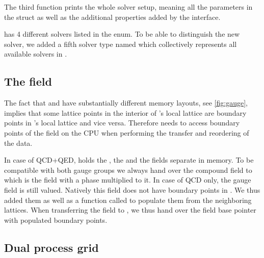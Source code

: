 The third function prints the whole solver setup, meaning all the parameters in the  struct as well as the additional properties added by the interface.

\Openqxd has \num{4} different solvers listed in the  enum. To be able to distinguish the new solver, we added a fifth solver type named  which collectively represents all available solvers in \quda.

\subsection{The  field}

The fact that \openqxd and \quda have substantially different memory layouts, see \cref{fig:gauge}, implies that some lattice points in the interior of \quda's local lattice are boundary points in \openqxd's local lattice and vice versa.
Therefore \quda needs to access boundary points of the field on the CPU when performing the transfer and reordering of the data.

In case of QCD+QED, \openqxd holds the , the  and the  fields separate in memory.
To be compatible with both gauge groups we always hand over the compound  field to \quda which is the  field with a  phase multiplied to it.
In case of QCD only, the  gauge field is still  valued.
Natively this field does not have boundary points in \openqxd.
We thus added them as well as a function called  to populate them from the neighboring lattices.
When transferring the field to \quda, we thus hand over the  field base pointer with populated boundary points.


\subsection{Dual process grid}
\label{sec:interface:openqxd:dual}

